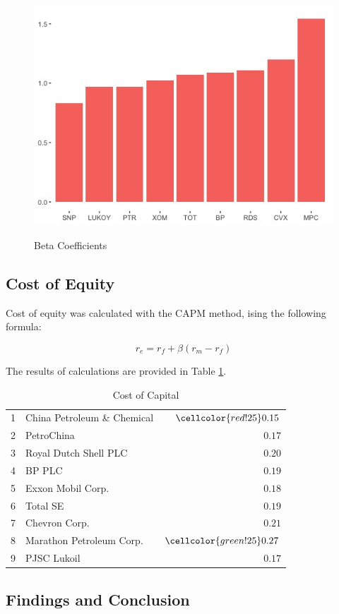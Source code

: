 \documentclass [a4paper, 11pt] {article}
\begin{document}
\begin{figure}[!h]
\caption{Beta Coefficients}
\includegraphics[scale=0.65]{beta_plot_bars}
\label{fig:beta}
\end{figure}

\clearpage
\subsection {Cost of Equity}

Cost of equity was calculated with the CAPM method, ising the following formula:

$$ r_e = r_f + \beta (r_m - r_f)$$

The results of calculations are provided in Table \ref{tab:r_e}.

\begin{table}[!h]
\caption{Cost of Capital\label{r}} 
\begin{center}
\begin{tabular}{llr}
\hline\hline
1&China Petroleum \& Chemical&$ \cellcolor{red!25} 0.15$\tabularnewline
2&PetroChina&$0.17$\tabularnewline
3&Royal Dutch Shell PLC&$0.20$\tabularnewline
4&BP PLC&$0.19$\tabularnewline
5&Exxon Mobil Corp.&$0.18$\tabularnewline
6&Total SE&$0.19$\tabularnewline
7&Chevron Corp.&$0.21$\tabularnewline
8&Marathon Petroleum Corp.&$ \cellcolor{green!25}0.27$\tabularnewline
9&PJSC Lukoil&$0.17$\tabularnewline
\hline
\end{tabular}\end{center}
\label{tab:r_e}
\end{table}



\clearpage
\subsection {Findings and Conclusion}

\clearpage
\newpage
\printbibliography [heading=bibintoc]
\end{document}
